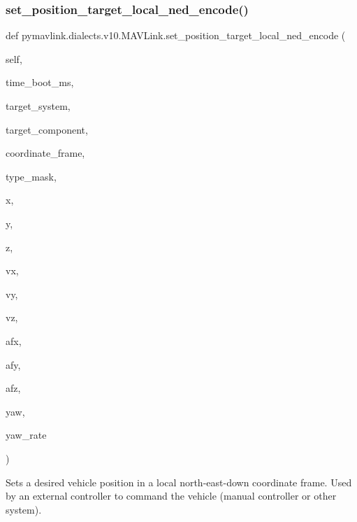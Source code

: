 \begin{DoxyVerb}
\begin{DoxyVerb}
\begin{DoxyVerb}
\begin{DoxyVerb}
\begin{DoxyVerb}
\begin{DoxyVerb}
\begin{DoxyVerb}
\begin{DoxyVerb}
\begin{DoxyVerb}
\begin{DoxyVerb}
\subsubsection{\texorpdfstring{set\+\_\+position\+\_\+target\+\_\+local\+\_\+ned\+\_\+encode()}{set\_position\_target\_local\_ned\_encode()}}
{\footnotesize\ttfamily def pymavlink.\+dialects.\+v10.\+M\+A\+V\+Link.\+set\+\_\+position\+\_\+target\+\_\+local\+\_\+ned\+\_\+encode (\begin{DoxyParamCaption}\item[{}]{self,  }\item[{}]{time\+\_\+boot\+\_\+ms,  }\item[{}]{target\+\_\+system,  }\item[{}]{target\+\_\+component,  }\item[{}]{coordinate\+\_\+frame,  }\item[{}]{type\+\_\+mask,  }\item[{}]{x,  }\item[{}]{y,  }\item[{}]{z,  }\item[{}]{vx,  }\item[{}]{vy,  }\item[{}]{vz,  }\item[{}]{afx,  }\item[{}]{afy,  }\item[{}]{afz,  }\item[{}]{yaw,  }\item[{}]{yaw\+\_\+rate }\end{DoxyParamCaption})}

\begin{DoxyVerb}Sets a desired vehicle position in a local north-east-down coordinate
frame. Used by an external controller to command the
vehicle (manual controller or other system).


\end{DoxyVerb}
\end{DoxyVerb}
\end{DoxyVerb}
\end{DoxyVerb}
\end{DoxyVerb}
\end{DoxyVerb}
\end{DoxyVerb}
\end{DoxyVerb}
\end{DoxyVerb}
\end{DoxyVerb}
\end{DoxyVerb}
